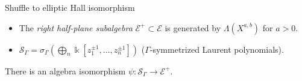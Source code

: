 \documentclass[dvipsnames]{beamer}
\newcommand{\Ecal}{\mathcal{E}}
\newcommand{\kk}{\Bbbk}
\newcommand{\Scal}{\mathcal{S}}
\theoremstyle{definition}
\begin{document}
\begin{frame}{Shuffle to elliptic Hall isomorphism}
  \begin{itemize}
\item The \emph{right half-plane subalgebra} $\Ecal^{+}\subset \Ecal$
is generated by $\Lambda (X^{a,b})$ for $a>0$. \pause
\item  $\Scal_\Gamma = \sigma_\Gamma\left( \bigoplus_n \kk[z_{1}^{\pm
      1},\ldots,z_n^{\pm 1}] \right)$  ($\Gamma$-symmetrized Laurent
  polynomials). \pause
\end{itemize}

\vspace{3mm}

\begin{theorem}
There is an algebra isomorphism
$\psi \colon \Scal_\Gamma \rightarrow \Ecal ^{+}$.
\end{theorem}
\end{frame}
\end{document}
